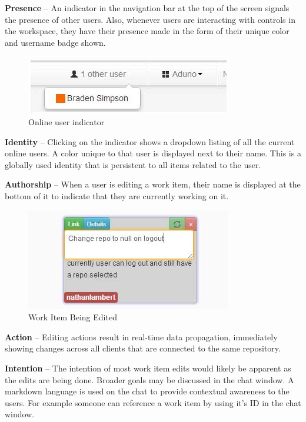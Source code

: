\documentclass[conference]{IEEEtran}
\begin{document}
{\bf Presence} – An indicator in the navigation bar at the top of the screen signals the presence of other users.  Also, whenever users are interacting with controls in the workspace, they have their presence made in the form of their unique color and username badge shown.

\begin{figure}[htb]
\centering
\includegraphics[scale=0.5]{aduno01}
\caption{Online user indicator}
\label{fig:otherusers}
\end{figure}

{\bf Identity} – Clicking on the indicator shows a dropdown listing of all the current online users. A color unique to that user is displayed next to their name.  This is a globally used identity that is persistent to all items related to the user. 

{\bf Authorship} – When a user is editing a work item, their name is displayed at the bottom of it to indicate that they are currently working on it.

\begin{figure}[htb]
\centering
\includegraphics[scale=0.5]{aduno02}
\caption{Work Item Being Edited}
\label{fig:workitem}
\end{figure}

{\bf Action} – Editing actions result in real-time data propagation, immediately showing changes across all clients that are connected to the same repository.  

{\bf Intention} – The intention of most work item edits would likely be apparent as the edits are being done. Broader goals may be discussed in the chat window. A markdown language is used on the chat to provide contextual awareness to the users.  For example someone can reference a work item by using it's ID in the chat window.
 
\end{document}
